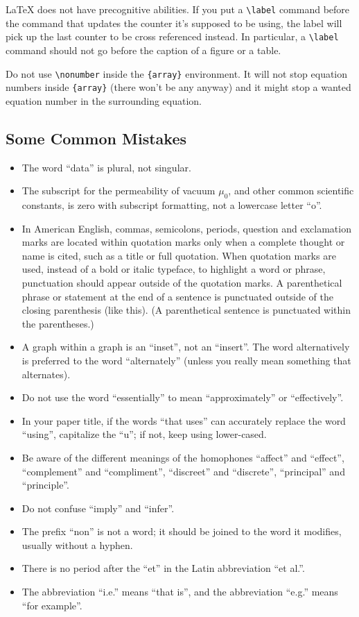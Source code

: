 \documentclass[conference]{IEEEtran}
\begin{document}
{\LaTeX} does not have precognitive abilities. If you put a
\verb|\label| command before the command that updates the counter it's
supposed to be using, the label will pick up the last counter to be cross
referenced instead. In particular, a \verb|\label| command should not
go before the caption of a figure or a table.

Do not use \verb|\nonumber| inside the \verb|{array}|
environment. It will not stop equation numbers inside \verb|{array}|
(there won't be any anyway) and it might stop a wanted equation number in the
surrounding equation.

\subsection{Some Common Mistakes}\label{SCM}
\begin{itemize}
    \item The word ``data'' is plural, not singular.
    \item The subscript for the permeability of vacuum $\mu_{0}$, and other
          common scientific constants, is zero with subscript formatting, not a lowercase
          letter ``o''.
    \item In American English, commas, semicolons, periods, question and exclamation
          marks are located within quotation marks only when a complete thought or name
          is cited, such as a title or full quotation. When quotation marks are used,
          instead of a bold or italic typeface, to highlight a word or phrase,
          punctuation should appear outside of the quotation marks. A parenthetical
          phrase or statement at the end of a sentence is punctuated outside of the
          closing parenthesis (like this). (A parenthetical sentence is punctuated within
          the parentheses.)
    \item A graph within a graph is an ``inset'', not an ``insert''. The word
          alternatively is preferred to the word ``alternately'' (unless you really mean
          something that alternates).
    \item Do not use the word ``essentially'' to mean ``approximately'' or
          ``effectively''.
    \item In your paper title, if the words ``that uses'' can accurately replace the word
          ``using'', capitalize the ``u''; if not, keep using lower-cased.
    \item Be aware of the different meanings of the homophones ``affect'' and ``effect'',
          ``complement'' and ``compliment'', ``discreet'' and ``discrete'', ``principal''
          and ``principle''.
    \item Do not confuse ``imply'' and ``infer''.
    \item The prefix ``non'' is not a word; it should be joined to the word it modifies,
          usually without a hyphen.
    \item There is no period after the ``et'' in the Latin abbreviation ``et al.''.
    \item The abbreviation ``i.e.'' means ``that is'', and the abbreviation ``e.g.''
          means ``for example''.
\end{itemize}
\end{document}
